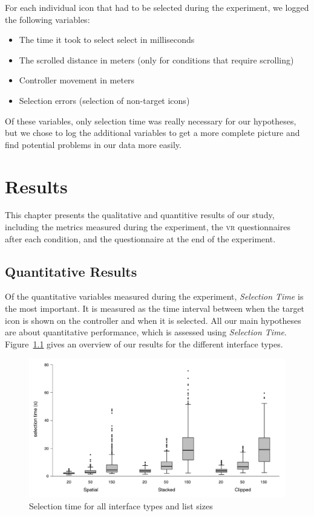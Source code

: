 \documentclass[nobib]{tufte-book} %
\begin{document}
For each individual icon that had to be selected during the experiment, we logged the following variables:

\begin{itemize}
  \item The time it took to select select in milliseconds
  \item The scrolled distance in meters (only for conditions that require scrolling)
  \item Controller movement in meters
  \item Selection errors (selection of non-target icons)
\end{itemize}


Of these variables, only selection time was really necessary for our hypotheses, but we chose to log the additional variables to get a more complete picture and find potential problems in our data more easily.



\chapter{Results}
\label{ch:results}

This chapter presents the qualitative and quantitive results of our study, including the metrics measured during the experiment, the \textsc{vr} questionnaires after each condition, and the questionnaire at the end of the experiment.

\section{Quantitative Results}
Of the quantitative variables measured during the experiment, \emph{Selection Time} is the most important. It is measured as the time interval between when the target icon is shown on the controller and when it is selected. All our main hypotheses are about quantitative performance, which is assessed using \emph{Selection Time}. Figure~\ref{fig:all-durations-chart} gives an overview of our results for the different interface types.

\begin{figure}[h]
  \includegraphics[width=\linewidth]{all-durations.pdf}
  \caption{Selection time for all interface types and list sizes}
  \label{fig:all-durations-chart}
\end{figure}
\end{document}
